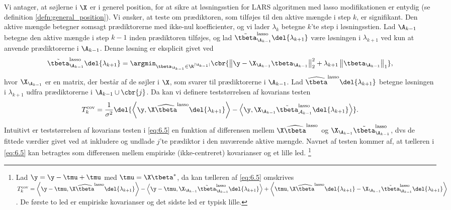Vi antager, at søjlerne i \(\X\) er i generel position, for at sikre at løsningsstien for LARS algoritmen med lasso modifikationen er entydig (se definition \ref{defn:general_position}).
Vi ønsker, at teste om prædiktoren, som tilføjes til den aktive mængde i step \(k\), er signifikant.
Den aktive mængde betegner somsagt prædiktorerne med ikke-nul koefficienter, og vi lader \(\lambda_k\) betegne \(k\)'te step i løsningsstien.
Lad \(\A_{k-1}\) betegne den aktive mængde i step \(k-1\) inden prædiktoren tilføjes, og lad \(\tilde{\tbeta}^\text{lasso}_{\A_{k-1}} \del{\lambda_{k+1}}\) være løsningen i \(\lambda_{k+1}\) ved kun at anvende prædiktorerne i \(\A_{k-1}\).
Denne løsning er eksplicit givet ved 
\begin{align*}
\tilde{\tbeta}^\text{lasso}_{\A_{k-1}} \del{\lambda_{k+1}} = \argmin_{\tbeta_{\A_{k-1}} \in \R^{\vert \A_{k-1} \vert}} \cbr{ \left\Vert \y - \X_{\A_{k-1}} \tbeta_{\A_{k-1}} \right\Vert_2^2 + \lambda_{k+1} \left\Vert \tbeta_{\A_{k-1}} \right\Vert_1},
\end{align*}
hvor \(\X_{\A_{k-1}}\) er en matrix, der består af de søjler i \(\X\), som svarer til prædiktorerne i \(\A_{k-1}\).
Lad \(\widehat{\tbeta}^\text{lasso} \del{\lambda_{k+1}}\) betegne løsningen i \(\lambda_{k+1}\) udfra prædiktorerne i \(\A_{k-1} \cup \cbr{j}\).
Da kan vi definere teststørrelsen af kovarians testen
\begin{align}
T_k^\text{cov} = \frac{1}{\sigma^2} \del{ \left\langle \y, \X \widehat{\tbeta}^\text{lasso} \del{\lambda_{k+1}} \right\rangle - \left\langle  \y, \X_{\A_{k-1}} \tilde{\tbeta}^\text{lasso}_{\mathcal{A}_{k-1}} \del{\lambda_{k+1}} \right\rangle}. \label{eq:6.5}
\end{align}
Intuitivt er teststørrelsen af kovarians testen i \eqref{eq:6.5} en funktion af differensen mellem \(\X \widehat{\tbeta}^\text{lasso}\) og \(\X_{\A_{k-1}} \tilde{\tbeta}^\text{lasso}_{\A_{k-1}}\), dvs de fittede værdier givet ved at inkludere og undlade \(j\)'te prædiktor i den nuværende aktive mængde.
Navnet af testen kommer af, at tælleren i \eqref{eq:6.5} kan betragtes som differensen mellem empiriske (ikke-centreret) kovarianser og et lille led. 
\footnote{Lad \(\y = \y - \tmu + \tmu\) med \(\tmu = \X \tbeta^*\), da kan tælleren af \eqref{eq:6.5} omskrives \(T_k^\text{cov} = \left\langle \y - \tmu, \X \widehat{\tbeta}^\text{lasso} \del{\lambda_{k+1}} \right\rangle - \left\langle \y - \tmu, \X_{\A_{k-1}} \tilde{\tbeta}^\text{lasso}_{\A_{k-1}} \del{\lambda_{k+1}} \right\rangle + \left\langle \tmu, \X \widehat{\tbeta}^\text{lasso} \del{\lambda_{k+1}} - \X_{\A_{k-1}} \tilde{\tbeta}^\text{lasso}_{\A_{k-1}} \del{\lambda_{k+1}} \right\rangle\).
De første to led er empiriske kovarianser og det sidste led er typisk lille.}
